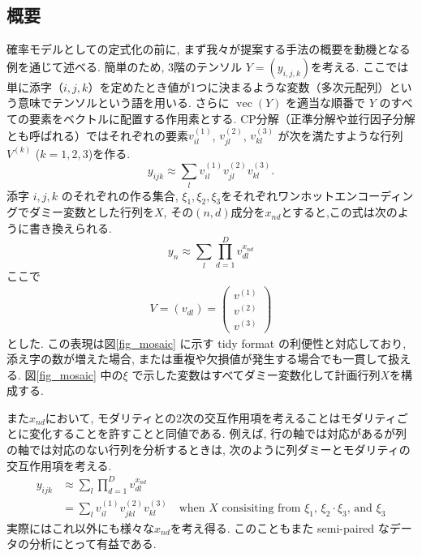 \documentclass[a4paper,12ptc]{jsarticle} %
\begin{document}
\subsection{概要}
確率モデルとしての定式化の前に, まず我々が提案する手法の概要を動機となる例を通じて述べる. 簡単のため, 3階のテンソル $Y=(y_{i,j,k})$を考える. ここでは単に添字（$i,j,k$）を定めたとき値が1つに決まるような変数（多次元配列）という意味でテンソルという語を用いる. さらに $\operatorname{vec}(Y)$ を適当な順番で $Y$ のすべての要素をベクトルに配置する作用素とする. 
CP分解（正準分解や並行因子分解とも呼ばれる）ではそれぞれの要素$v_{il}^{(1)}$, $v_{jl}^{(2)}$, $ v_{kl}^{(3)}$ が次を満たすような行列 $V^{(k)}$ ($k=1,2,3$)を作る.
\begin{equation*}
y_{ijk} \approx \sum_{l}v_{il}^{(1)} v_{jl}^{(2)} v_{kl}^{(3)}. 
\end{equation*}
添字 $i,j,k$ のそれぞれの作る集合, $\xi_1, \xi_2, \xi_3$をそれぞれワンホットエンコーディングでダミー変数とした行列を$X$, その$(n,d)$成分を$x_{nd}$とすると,この式は次のように書き換えられる.
\begin{equation}
y_{n} \approx \sum_{l}\prod_{d=1}^D v_{dl}^{x_{nd}} \label{eq_approx}
\end{equation}
ここで
\begin{align*}
V=(v_{dl})=\begin{pmatrix}
v^{(1)}\\
v^{(2)}\\
v^{(3)}
\end{pmatrix}
\end{align*}
とした. この表現は図\ref{fig_mosaic} に示す tidy format  \cite{Wickham2019} の利便性と対応しており, 添え字の数が増えた場合, または重複や欠損値が発生する場合でも一貫して扱える. 図\ref{fig_mosaic} 中の$\xi$ で示した変数はすべてダミー変数化して計画行列$X$を構成する.

また$x_{nd}$において, モダリティとの2次の交互作用項を考えることはモダリティごとに変化することを許すことと同値である. 
例えば, 行の軸では対応があるが列の軸では対応のない行列を分析するときは, 次のように列ダミーとモダリティの交互作用項を考える.
\begin{align*}
y_{ijk} &\approx \sum_{l}\prod_{d=1}^D v_{dl}^{x_{nd}} \\
&=\sum_{l}v_{il}^{(1)} v_{jkl}^{(2)} v_{kl}^{(3)} \quad \mbox{when $X$ consisiting from $\xi_1$, $\xi_2 \cdot \xi_3$, and $\xi_3$}
\end{align*}
実際にはこれ以外にも様々な$x_{nd}$を考え得る. このこともまた semi-paired なデータの分析にとって有益である. 
\end{document}

